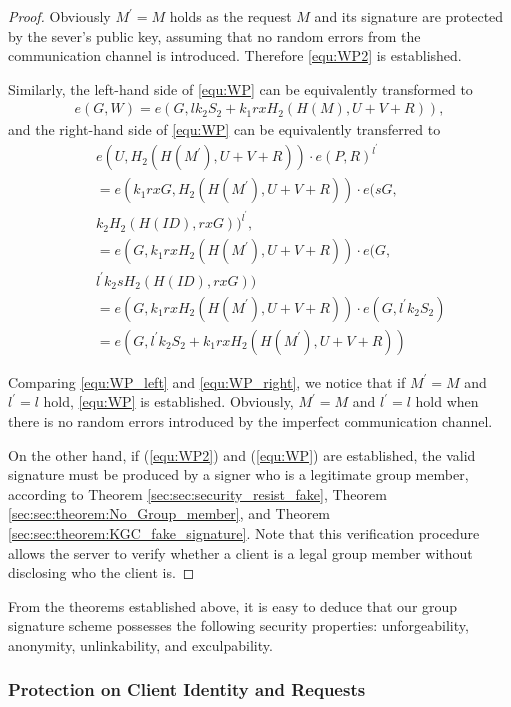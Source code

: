 \documentclass[letterpaper,12pt]{article}
\begin{document}
\begin{proof}
Obviously $M^\prime=M$ holds as the request $M$ and its signature are protected by the sever's public key, assuming that no random errors from the communication channel is introduced. Therefore \eqref{equ:WP2} is established.

Similarly, the left-hand side of \eqref{equ:WP} can  be equivalently transformed to
%
\begin{eqnarray}\label{equ:WP_left}
e(G, W)=e(G, lk_2S_2+k_1rxH_2(H(M), U+V+R)),
\end{eqnarray}
%
and the right-hand side of \eqref{equ:WP} can be equivalently transferred to
\begin{eqnarray}\label{equ:WP_right}
&&e(U, H_2(H(M^\prime), U+V+R))\cdot e(P, R)^{l^\prime} \nonumber\\
&&=e(k_1rxG, H_2(H(M^\prime), U+V+R))\cdot e(sG, \nonumber\\
&&k_2H_2(H(ID), rxG))^{l^\prime}, \nonumber\\
&&= e(G, k_1rxH_2(H(M^\prime), U+V+R))\cdot e(G,\nonumber\\
&&l^\prime k_2sH_2(H(ID), rxG))\nonumber\\
&&=e(G, k_1rxH_2(H(M^\prime), U+V+R))\cdot e(G, l^\prime k_2S_2)  \nonumber\\
&&=e(G, l^\prime k_2S_2+k_1rxH_2(H(M^\prime), U+V+R))
\end{eqnarray}

Comparing  \eqref{equ:WP_left} and \eqref{equ:WP_right}, we notice that if $M^\prime=M$ and $l^\prime=l$ hold,  \eqref{equ:WP} is established. Obviously, $M^\prime=M$ and $l^\prime=l$ hold when there is no random errors introduced by the imperfect communication channel.

On the other hand, if  (\ref{equ:WP2}) and (\ref{equ:WP}) are established,  the valid signature must be produced by a signer who is a legitimate group member, according to Theorem \ref{sec:sec:security_resist_fake}, Theorem \ref{sec:sec:theorem:No_Group_member}, and Theorem \ref{sec:sec:theorem:KGC_fake_signature}. Note that this verification procedure allows the server to verify whether a client is a legal group member without disclosing who the client is.
\end{proof}

From the theorems established above, it is easy to deduce that our group signature scheme possesses the following security properties: unforgeability, anonymity, unlinkability, and exculpability.



\subsubsection{Protection on Client Identity and Requests}
\end{document}
